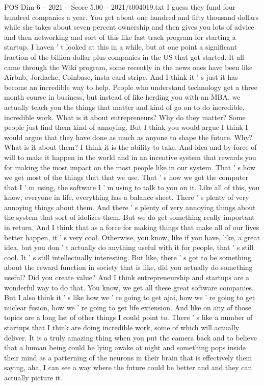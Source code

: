 \begin{textsample}{POS Dim 6 – 2021 – Score 5.00 – 2021/t004019.txt}
I guess they fund four hundred companies a year.
You get about one hundred and fifty thousand dollars while she takes about seven percent ownership and then gives you lots of advice and then networking and sort of this like fast track program for starting a startup.
I haven ' t looked at this in a while, but at one point a significant fraction of the billion dollar plus companies in the US that got started.
It all came through the Wiki program, some recently in the news ones have been like Airbnb, Jordache, Coinbase, insta card stripe.
And I think it ' s just it has become an incredible way to help.
People who understand technology get a three month course in business, but instead of like herding you with an MBA, we actually teach you the things that matter and kind of go on to do incredible, incredible work.
What is it about entrepreneurs?
Why do they matter?
Some people just find them kind of annoying.
But I think you would argue I think I would argue that they have done as much as anyone to shape the future.
Why?
What is it about them?
I think it is the ability to take.
And idea and by force of will to make it happen in the world and in an incentive system that rewards you for making the most impact on the most people like in our system.
That ' s how we get most of the things that that we use.
That ' s how we got the computer that I ' m using, the software I ' m using to talk to you on it.
Like all of this, you know, everyone in life, everything has a balance sheet.
There ' s plenty of very annoying things about them.
And there ' s plenty of very annoying things about the system that sort of idolizes them.
But we do get something really important in return.
And I think that as a force for making things that make all of our lives better happen, it ' s very cool.
Otherwise, you know, like if you have, like, a great idea, but you don ' t actually do anything useful with it for people, that ' s still cool.
It ' s still intellectually interesting.
But like, there ' s got to be something about the reward function in society that is like, did you actually do something useful?
Did you create value?
And I think entrepreneurship and startups are a wonderful way to do that.
You know, we get all these great software companies.
But I also think it ' s like how we ' re going to get ajai, how we ' re going to get nuclear fusion, how we ' re going to get life extension.
And like on any of those topics are a long list of other things I could point to.
There ' s like a number of startups that I think are doing incredible work, some of which will actually deliver.
It is a truly amazing thing when you put the camera back and to believe that a human being could be lying awake at night and something pops inside their mind as a patterning of the neurons in their brain that is effectively them saying, aha, I can see a way where the future could be better and and they can actually picture it.

\end{textsample}
